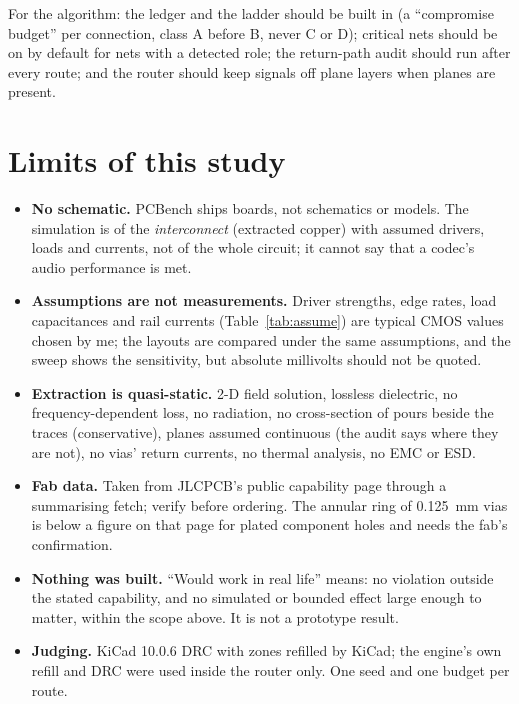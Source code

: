 \documentclass[10pt,a4paper]{article}
\begin{document}
For the algorithm: the ledger and the ladder should be built in (a ``compromise budget'' per connection, class A before B, never C or D); critical nets should be on by default for nets with a detected role; the return-path audit should run after every route; and the router should keep signals off plane layers when planes are present.

\section{Limits of this study}\label{sec:limits}

\begin{itemize}
\item \textbf{No schematic.} PCBench ships boards, not schematics or models. The simulation is of the \emph{interconnect} (extracted copper) with assumed drivers, loads and currents, not of the whole circuit; it cannot say that a codec's audio performance is met.
\item \textbf{Assumptions are not measurements.} Driver strengths, edge rates, load capacitances and rail currents (Table~\ref{tab:assume}) are typical CMOS values chosen by me; the layouts are compared under the same assumptions, and the sweep shows the sensitivity, but absolute millivolts should not be quoted.
\item \textbf{Extraction is quasi-static.} 2-D field solution, lossless dielectric, no frequency-dependent loss, no radiation, no cross-section of pours beside the traces (conservative), planes assumed continuous (the audit says where they are not), no vias' return currents, no thermal analysis, no EMC or ESD.
\item \textbf{Fab data.} Taken from JLCPCB's public capability page through a summarising fetch; verify before ordering. The annular ring of 0.125~mm vias is below a figure on that page for plated component holes and needs the fab's confirmation.
\item \textbf{Nothing was built.} ``Would work in real life'' means: no violation outside the stated capability, and no simulated or bounded effect large enough to matter, within the scope above. It is not a prototype result.
\item \textbf{Judging.} KiCad 10.0.6 DRC with zones refilled by KiCad; the engine's own refill and DRC were used inside the router only. One seed and one budget per route.
\end{itemize}
\end{document}
